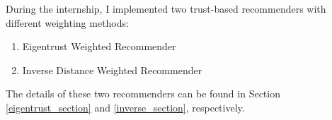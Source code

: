	During the internship, I implemented two trust-based recommenders with different weighting methods:
	\begin{enumerate}
		\item Eigentrust Weighted Recommender
		\item Inverse Distance Weighted Recommender
	\end{enumerate} 
	The details of these two recommenders can be found in Section \ref{eigentrust_section} and \ref{inverse_section}, respectively.